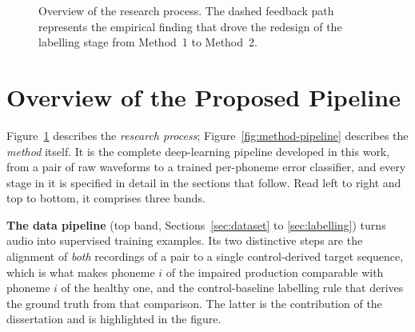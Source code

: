 \begin{figure}[H]
\centering
{}
\caption[Research methodology overview]{Overview of the research process. The
dashed feedback path represents the empirical finding that drove the
redesign of the labelling stage from Method~1 to Method~2.}
\label{fig:methodology-overview}
\end{figure}

\section{Overview of the Proposed Pipeline}
\label{sec:pipeline-overview}

Figure~\ref{fig:methodology-overview} describes the \emph{research process};
Figure~\ref{fig:method-pipeline} describes the \emph{method} itself. It is the
complete deep-learning pipeline developed in this work, from a pair of raw
waveforms to a trained per-phoneme error classifier, and every stage in it is
specified in detail in the sections that follow. Read left to right and top to
bottom, it comprises three bands.

\textbf{The data pipeline} (top band, Sections~\ref{sec:dataset} to
\ref{sec:labelling}) turns audio into supervised training examples. Its two
distinctive steps are the alignment of \emph{both} recordings of a pair to a
single control-derived target sequence, which is what makes phoneme $i$ of the
impaired production comparable with phoneme $i$ of the healthy one, and the
control-baseline labelling rule that derives the ground truth from that
comparison. The latter is the contribution of the dissertation and is
highlighted in the figure.

